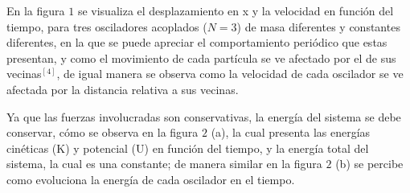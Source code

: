 \documentclass[11pt,letterpaper,twocolumn]{article}
\begin{document}
En la figura $1$ se visualiza el desplazamiento en x y la velocidad en función del tiempo, para tres osciladores acoplados ($N=3$) de masa diferentes y constantes diferentes, en la que se puede apreciar el comportamiento periódico que estas presentan, y como el movimiento de cada partícula se ve afectado por el de sus vecinas$^{[4]}$, de igual manera se observa como la velocidad de cada oscilador se ve afectada por la distancia relativa a sus vecinas.\\
\par 
Ya que las fuerzas involucradas son conservativas, la energía del sistema se debe conservar, cómo se observa en la figura $2$ (a), la cual presenta las energías cinéticas (K) y potencial (U) en función del tiempo, y la energía total del sistema, la cual es una constante; de manera similar en la figura $2$ (b) se percibe como evoluciona la energía de cada oscilador en el tiempo.\\
\end{document}
